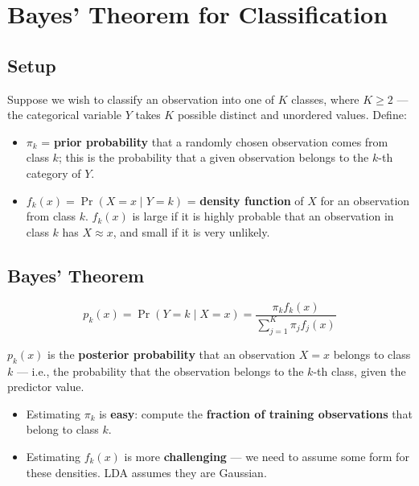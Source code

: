 \documentclass[11pt,a4paper]{article}
\theoremstyle{definition}
\theoremstyle{plain}
\theoremstyle{remark}
\begin{document}
\section{Bayes' Theorem for Classification}

\subsection{Setup}

Suppose we wish to classify an observation into one of $K$ classes, where $K \geq 2$ — the categorical variable $Y$ takes $K$ possible distinct and unordered values. Define:
\begin{itemize}
    \item $\pi_k$ = \textbf{prior probability} that a randomly chosen observation comes from class $k$; this is the probability that a given observation belongs to the $k$-th category of $Y$.
    \item $f_k(x) = \Pr(X = x \mid Y = k)$ = \textbf{density function} of $X$ for an observation from class $k$. $f_k(x)$ is large if it is highly probable that an observation in class $k$ has $X \approx x$, and small if it is very unlikely.
\end{itemize}

\subsection{Bayes' Theorem}

\begin{tcolorbox}[colback=blue!5!white,colframe=blue!75!black,title=\textbf{Bayes' Theorem for Classification}]
\[
    p_k(x) = \Pr(Y = k \mid X = x) = \frac{\pi_k f_k(x)}{\displaystyle\sum_{j=1}^{K} \pi_j f_j(x)}
\]
\end{tcolorbox}

$p_k(x)$ is the \textbf{posterior probability} that an observation $X = x$ belongs to class $k$ — i.e., the probability that the observation belongs to the $k$-th class, given the predictor value.

\begin{itemize}
    \item Estimating $\pi_k$ is \textbf{easy}: compute the \textbf{fraction of training observations} that belong to class $k$.
    \item Estimating $f_k(x)$ is more \textbf{challenging} — we need to assume some form for these densities. LDA assumes they are Gaussian.
\end{itemize}
\end{document}
